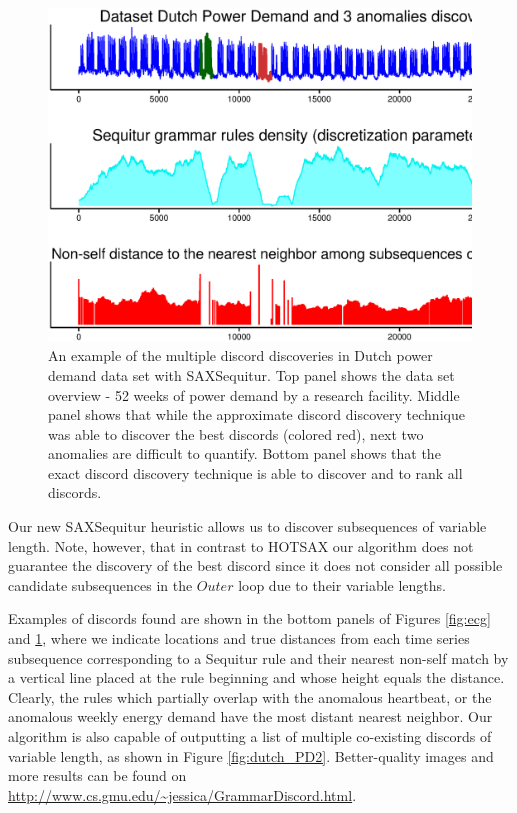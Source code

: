 \documentclass{llncs}
\begin{document}
\begin{figure}[!t]
   \vspace{-0.3cm}
   \centering
   \includegraphics[width=120mm]{DutchPD_new.ps}
   \caption{An example of the multiple discord discoveries in Dutch power demand data set with SAXSequitur. Top panel shows the data set overview - 52 weeks of power demand by a research facility. Middle panel shows that while the approximate discord discovery technique was able to discover the best discords (colored red), next two anomalies are difficult to quantify. Bottom panel shows that the exact discord discovery technique is able to discover and to rank all discords.}
   \label{fig:dutch_PD}
   \vspace{-0.3cm}
\end{figure}

Our new SAXSequitur heuristic allows us to discover subsequences of variable length. Note, however, that in contrast to HOTSAX our algorithm does not guarantee the discovery of the best discord since it does not consider all possible candidate subsequences in the $Outer$ loop due to their variable lengths.

Examples of discords found are shown in the bottom panels of Figures \ref{fig:ecg} and \ref{fig:dutch_PD}, where we indicate locations and true distances from each time series subsequence corresponding to a Sequitur rule and their nearest non-self match by a vertical line placed at the rule beginning and whose height equals the distance. Clearly, the rules which partially overlap with the anomalous heartbeat, or the anomalous weekly energy demand have the most distant nearest neighbor. Our algorithm is also capable of outputting a list of multiple co-existing discords of variable length, as shown in Figure \ref{fig:dutch_PD2}. Better-quality images and more results can be found on \url{http://www.cs.gmu.edu/~jessica/GrammarDiscord.html}.
\end{document}
